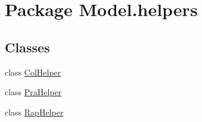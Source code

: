 \hypertarget{namespace_model_1_1helpers}{\section{Package Model.\-helpers}
\label{namespace_model_1_1helpers}
}
\subsection*{Classes}
\begin{DoxyCompactItemize}
\item 
class \hyperlink{class_model_1_1helpers_1_1_col_helper}{Col\-Helper}
\item 
class \hyperlink{class_model_1_1helpers_1_1_pra_helper}{Pra\-Helper}
\item 
class \hyperlink{class_model_1_1helpers_1_1_rap_helper}{Rap\-Helper}
\end{DoxyCompactItemize}
